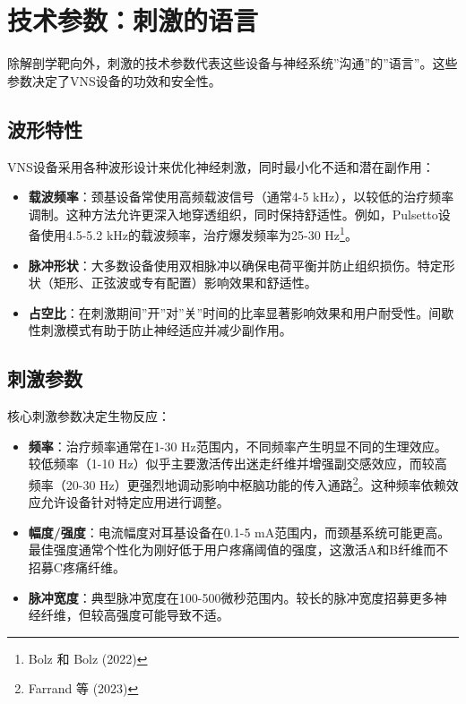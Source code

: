 \documentclass[
  Letterpaper,
]{scrbook}
\begin{document}
\section{技术参数：刺激的语言}\label{ux6280ux672fux53c2ux6570ux523aux6fc0ux7684ux8bedux8a00}

除解剖学靶向外，刺激的技术参数代表这些设备与神经系统''沟通''的''语言''。这些参数决定了VNS设备的功效和安全性。

\subsection{波形特性}\label{ux6ce2ux5f62ux7279ux6027}

VNS设备采用各种波形设计来优化神经刺激，同时最小化不适和潜在副作用：

\begin{itemize}
\item
  \textbf{载波频率}：颈基设备常使用高频载波信号（通常4-5
  kHz），以较低的治疗频率调制。这种方法允许更深入地穿透组织，同时保持舒适性。例如，Pulsetto设备使用4.5-5.2
  kHz的载波频率，治疗爆发频率为25-30 Hz\footnote{Bolz 和 Bolz (2022)}。
\item
  \textbf{脉冲形状}：大多数设备使用双相脉冲以确保电荷平衡并防止组织损伤。特定形状（矩形、正弦波或专有配置）影响效果和舒适性。
\item
  \textbf{占空比}：在刺激期间''开''对''关''时间的比率显著影响效果和用户耐受性。间歇性刺激模式有助于防止神经适应并减少副作用。
\end{itemize}

\subsection{刺激参数}\label{ux523aux6fc0ux53c2ux6570}

核心刺激参数决定生物反应：

\begin{itemize}
\item
  \textbf{频率}：治疗频率通常在1-30
  Hz范围内，不同频率产生明显不同的生理效应。较低频率（1-10
  Hz）似乎主要激活传出迷走纤维并增强副交感效应，而较高频率（20-30
  Hz）更强烈地调动影响中枢脑功能的传入通路\footnote{Farrand 等 (2023)}。这种频率依赖效应允许设备针对特定应用进行调整。
\item
  \textbf{幅度/强度}：电流幅度对耳基设备在0.1-5
  mA范围内，而颈基系统可能更高。最佳强度通常个性化为刚好低于用户疼痛阈值的强度，这激活A和B纤维而不招募C疼痛纤维。
\item
  \textbf{脉冲宽度}：典型脉冲宽度在100-500微秒范围内。较长的脉冲宽度招募更多神经纤维，但较高强度可能导致不适。
\end{itemize}
\end{document}
